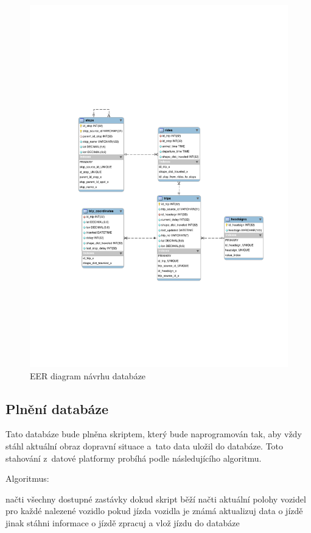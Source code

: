 \begin{figure}[p]\centering
\includegraphics[width=\linewidth]{../img/eer_database}
\caption{EER diagram návrhu databáze}
\label{fig:EER}
\end{figure}

\subsection{Plnění databáze}


Tato databáze bude plněna skriptem, který bude naprogramován tak, aby vždy stáhl aktuální obraz dopravní situace a~tato data uložil do databáze. Toto stahování z~datové platformy probíhá podle následujícího algoritmu.


\bigbreak


Algoritmus:
\begin{code}[frame=none]
načti všechny dostupné zastávky
dokud skript běží
  načti aktuální polohy vozidel
  pro každé nalezené vozidlo
    pokud jízda vozidla je známá
      aktualizuj data o jízdě
    jinak
      stáhni informace o jízdě
    zpracuj a vlož jízdu do databáze
\end{code}



